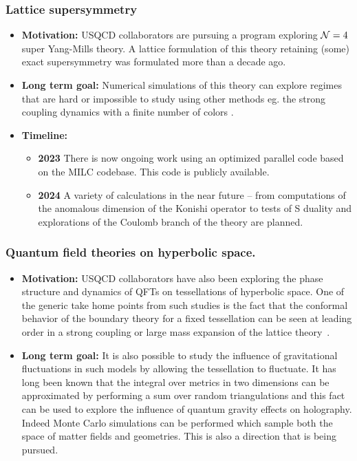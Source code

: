 \documentclass[12pt,hyperpdf]{article}
\begin{document}
\subsubsection{Lattice supersymmetry}
\begin{itemize}
   \item{ \bf Motivation:}
USQCD collaborators are pursuing a program exploring ${\cal N}=4$ super Yang-Mills
theory. 
 A lattice formulation of this theory retaining (some) exact supersymmetry was formulated
more than a decade ago. 
 \item { \bf Long term goal:} Numerical simulations of this theory can explore regimes
that are hard or impossible to study using other methods eg. the strong coupling dynamics
with a finite number of colors \cite{Catterall:2020lsi}. 
   \item{\bf Timeline:}
   \begin{itemize}
   \item{\bf 2023} There is now ongoing work using an optimized parallel code based on the 
MILC codebase. This code is publicly available.
    \item{\bf 2024} A variety of calculations in the near future -- from computations of the anomalous dimension of the Konishi operator to tests of S duality and explorations of the Coulomb branch of the theory are planned.
\end{itemize}
\end{itemize}

\subsubsection{Quantum field theories on hyperbolic space.}

\begin{itemize}
   \item{ \bf Motivation:} USQCD collaborators have also been exploring the phase structure
and dynamics of QFTs on tessellations of hyperbolic space. 
One of the generic take home points from such studies is the fact that the conformal
behavior of the boundary theory for a fixed
tessellation can be seen at leading order in a strong coupling or
large mass expansion of the lattice theory~\cite{Asaduzzaman:2020hjl}.
    \item { \bf Long term goal:} It is also possible to study the influence of gravitational fluctuations in
such models by allowing the tessellation to fluctuate. It has long been known that
the integral over metrics in two dimensions can be approximated by performing a sum
over random triangulations and this fact can be used to explore the influence of
quantum gravity effects on holography. Indeed Monte Carlo simulations can be
performed which sample both the space of matter fields and geometries. This is
also a direction that is being pursued. 
\end{itemize}
\end{document}
